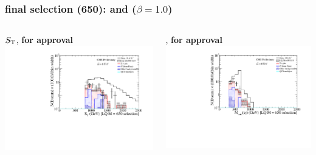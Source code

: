 \documentclass[bigger]{beamer}
\providecommand{\alert}[1]{\textbf{#1}}
\begin{document}
\begin{frame}
\frametitle{\eejj final selection (650): \ST and \mejmin ($\beta = 1.0$)}
\label{sec-2-4-3}
\begin{columns}
\begin{column}{0.6\textwidth}
\label{sec-2-4-3-1}

\centering
$S_{\text{T}}$, \alert{for approval}
\includegraphics[width=\textwidth]{fig/ee/finalSelection/sT_eejj_LQ650_eejj.pdf}
\end{column}
\begin{column}{0.6\textwidth}
\label{sec-2-4-3-2}

\centering
\mejmin, \alert{for approval}
\includegraphics[width=\textwidth]{fig/ee/finalSelection/Mej_selected_min_LQ650_eejj.pdf}
\end{column}
\end{columns}
\end{frame}
\end{document}
